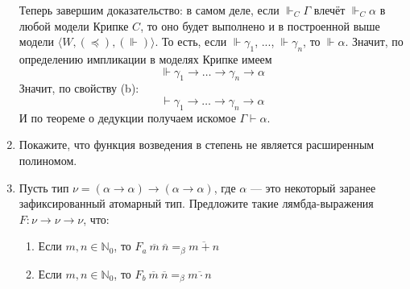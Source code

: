 \documentclass[10pt,a4paper,oneside]{article}
\begin{document}
\begin{enumerate}
Теперь завершим доказательство: в самом деле, если $\Vdash_C \Gamma$ влечёт $\Vdash_C \alpha$ в любой
модели Крипке $C$, то оно будет выполнено и в построенной выше модели $\langle W, (\preceq), (\Vdash) \rangle$.
То есть, если $\Vdash \gamma_1$, ..., $\Vdash \gamma_n$, то $\Vdash \alpha$.
Значит, по определению импликации в моделях Крипке имеем $$\Vdash \gamma_1\rightarrow\dots\rightarrow\gamma_n\rightarrow\alpha$$
Значит, по свойству (b): $$\vdash \gamma_1\rightarrow\dots\rightarrow\gamma_n\rightarrow\alpha$$
И по теореме о дедукции получаем искомое $\Gamma\vdash\alpha$.

\item Покажите, что функция возведения в степень не является расширенным полиномом.

\item Пусть тип $\nu = (\alpha\rightarrow\alpha)\rightarrow(\alpha\rightarrow\alpha)$, где
$\alpha$ --- это некоторый заранее зафиксированный атомарный тип.
Предложите такие лямбда-выражения $F : \nu\rightarrow\nu\rightarrow\nu$, что:
\begin{enumerate}
\item Если $m,n \in \mathbb{N}_0$, то $F_a\ \overline{m}\ \overline{n} =_\beta \overline{m + n}$
\item Если $m,n \in \mathbb{N}_0$, то $F_b\ \overline{m}\ \overline{n} =_\beta \overline{m \cdot n}$
\end{enumerate}


\end{enumerate}
\end{document}
